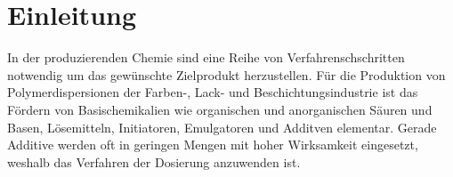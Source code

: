 \section{Einleitung}
\label{sec:einleitung}


 
In der produzierenden Chemie sind eine Reihe von Verfahrenschschritten notwendig um das gewünschte Zielprodukt herzustellen. Für die Produktion von Polymerdispersionen der Farben-, Lack- und Beschichtungsindustrie ist das Fördern von Basischemikalien wie organischen und anorganischen Säuren und Basen, Lösemitteln, Initiatoren, Emulgatoren und Additven elementar. Gerade Additive werden oft in geringen Mengen mit hoher Wirksamkeit eingesetzt, weshalb das Verfahren der Dosierung anzuwenden ist. 
 